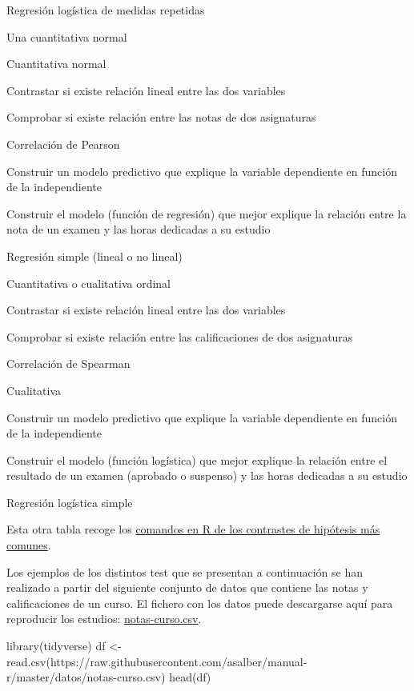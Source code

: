 \documentclass[
  spanish,
  a4paper,
]{scrreport}
\newenvironment{Shaded}{\begin{snugshade}}{\end{snugshade}}
\newcommand{\FunctionTok}[1]{\textcolor[rgb]{0.28,0.35,0.67}{#1}}
\newcommand{\NormalTok}[1]{\textcolor[rgb]{0.00,0.23,0.31}{#1}}
\newcommand{\OtherTok}[1]{\textcolor[rgb]{0.00,0.23,0.31}{#1}}
\newcommand{\StringTok}[1]{\textcolor[rgb]{0.13,0.47,0.30}{#1}}
\theoremstyle{definition}
\theoremstyle{definition}
\theoremstyle{remark}
\begin{document}
Regresión logística de medidas repetidas

Una cuantitativa normal

Cuantitativa normal

Contrastar si existe relación lineal entre las dos variables

Comprobar si existe relación entre las notas de dos asignaturas

Correlación de Pearson

Construir un modelo predictivo que explique la variable dependiente en
función de la independiente

Construir el modelo (función de regresión) que mejor explique la
relación entre la nota de un examen y las horas dedicadas a su estudio

Regresión simple (lineal o no lineal)

Cuantitativa o cualitativa ordinal

Contrastar si existe relación lineal entre las dos variables

Comprobar si existe relación entre las calificaciones de dos asignaturas

Correlación de Spearman

Cualitativa

Construir un modelo predictivo que explique la variable dependiente en
función de la independiente

Construir el modelo (función logística) que mejor explique la relación
entre el resultado de un examen (aprobado o suspenso) y las horas
dedicadas a su estudio

Regresión logística simple

Esta otra tabla recoge los \href{tablas/tabla_contrastes_r.pdf}{comandos
en R de los contrastes de hipótesis más comunes}.

Los ejemplos de los distintos test que se presentan a continuación se
han realizado a partir del siguiente conjunto de datos que contiene las
notas y calificaciones de un curso. El fichero con los datos puede
descargarse aquí para reproducir los estudios:
\href{https://raw.githubusercontent.com/asalber/manual-r/master/datos/notas-curso.csv}{notas-curso.csv}.

\begin{Shaded}
\begin{Highlighting}[]
\FunctionTok{library}\NormalTok{(tidyverse)}
\NormalTok{df }\OtherTok{\textless{}{-}} \FunctionTok{read.csv}\NormalTok{(}\StringTok{\textquotesingle{}https://raw.githubusercontent.com/asalber/manual{-}r/master/datos/notas{-}curso.csv\textquotesingle{}}\NormalTok{)}
\FunctionTok{head}\NormalTok{(df)}
\end{Highlighting}
\end{Shaded}
\end{document}
